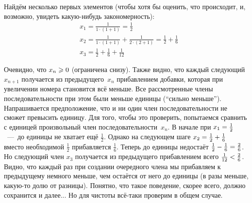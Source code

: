 \documentclass[a4paper,12pt]{article}
\begin{document}
  \begin{solution}
    Найдём несколько первых элементов (чтобы хотя бы оценить, что происходит, и, возможно, увидеть какую-нибудь закономерность):
    \[
      \begin{aligned}
        &x_1 = \frac{1}{1 \cdot (1 + 1)} = \frac{1}{2}\\
        &x_2 = \frac{1}{1 \cdot (1 + 1)} + \frac{1}{2 \cdot (2 + 1)} = \frac{1}{2} + \frac{1}{6}\\
        &x_3 = \frac{1}{2} + \frac{1}{6} + \frac{1}{12}
      \end{aligned}
    \]
    
    Очевидно, что $x_n \hm\geq 0$ (ограничена снизу).
    Также видно, что каждый следующий $x_{n + 1}$ получается из предыдущего~$x_n$ прибавлением добавки, которая при увеличении номера становится всё меньше.
    Все рассмотренные члены последовательности при этом были меньше единицы (``сильно меньше'').
    Напрашивается предположение, что и ни один член последовательности не сможет превысить единицу.
    Для того, чтобы это проверить, попытаемся сравнить с единицей произвольный член последовательности~$x_n$.
    В начале при $x_1 \hm= \frac{1}{2}$~---~до единицы не хватает ещё $\frac{1}{2}$.
    Однако на следующем шаге $x_2 \hm= \frac{1}{2} \hm+ \frac{1}{6}$ вместо необходимой $\frac{1}{2}$ прибавляется $\frac{1}{6}$.
    Теперь до единицы недостаёт $\frac{1}{2} \hm- \frac{1}{6} \hm= \frac{2}{6}$.
    Но следующий член $x_3$ получается из предыдущего прибавлением всего $\frac{1}{12} \hm< \frac{2}{6}$.
    Видно, что каждый раз при создании очередного члена мы прибавляем к предыдущему немного меньше, чем остаётся от него до единицы (в разы меньше, какую-то долю от разницы).
    Понятно, что такое поведение, скорее всего, должно сохранится и далее...
    Но для чистоты всё-таки проверим в общем случае.
    
    

\end{solution}
\end{document}
